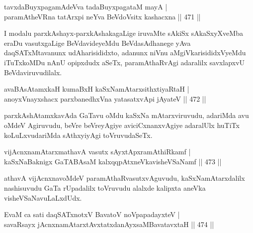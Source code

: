 \begin{shl}
tavxdaBuyxpagamAdeVva tadaBuyxpagataM mayA | \\
paramAtheVRna tatArxpi neYva BeVdoV\s sitx kashacxna \hfill||  471 ||  
\end{shl}

\begin{artha}
I modalu parxkAshayx-parxkAshakagaLige iruvaMte sAkiSx sAkaSxyXveMba eraDu vasutxgaLige BeVdavideyeMdu BeVdasAdhanege yAva daqSATxMtavanunx udAharisididxto, adanunx niVnu aMgiVkarisididxVyeMdu iTuTxkoMDu nAnU opipxdudx aSeTx, paramAthaRvAgi adaralilx savxlapxvU BeVdaviruvudilalx.
\end{artha}


\begin{shl}
avaBAsAtamxkaH kumaBxH kaSxNamAtarxsithxtiyaRtaH | \\
anoyxV\s nayxshacx parxbanedhxVna yatasatxvApi jAyateV \hfill||  472 ||  
\end{shl}

\begin{artha}
parxkAshAtamxkavAda GaTavu oMdu kaSxNa mAtarxviruvudu, adariMda avu oMdeV Agiruvudu, beVre beVreyAgiye aviciCxnanxvAgiye adaralUlx huTiTx koLuLxvudariMda sAthxyiyAgi toVruvudaSeTx.
\end{artha}


\begin{shl}
vijAcnxnamAtarxmathavA vasutx sAyxtApxramAthiRkamf | \\
kaSxNaBaknigx GaTABAsaM \footnotemark[1]kalxqqpAtxneVkavisheVSaNamf \hfill||  473 ||  
\end{shl}

\begin{artha}
athavA vijAcnxnavoMdeV paramAthaRvasutxvAguvudu, kaSxNamAtarxdalilx nashisuvudu GaTa rUpadalilx toVruvudu alalxde kalipxta aneVka visheVSaNavuLaLxdUdx.
\end{artha}

\begin{shl}
EvaM ca sati daqSATxnotxV BavatoV noVpapadayxteV | \\
savaRsayx jAcnxnamAtarxtAvxtatxdanAyxsaMBavatavxtaH \hfill||  474 ||  
\end{shl}


